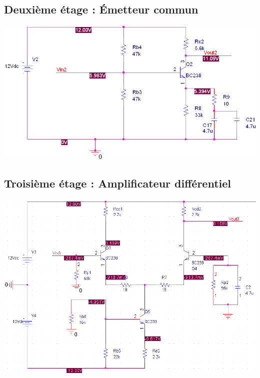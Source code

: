 \documentclass[11pt;a4paper]{report}
\begin{document}
   \subsection{Deuxième étage : Émetteur commun}
    \begin{center}
     \includegraphics[width=17cm]{images/etage2.PNG}
    \end{center}

   \subsection{Troisième étage : Amplificateur différentiel}
    \begin{center}
     \includegraphics[width=17cm]{images/etage3.PNG}
    \end{center}
\end{document}
